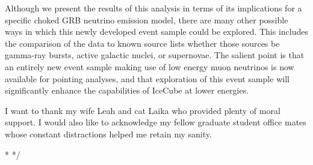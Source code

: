 \documentclass{gatech-thesis}
\begin{document}
\begin{preliminary}
\begin{preface}

Although we present the results of this analysis in terms of its implications for a specific choked GRB neutrino emission model, there are many other possible ways in which this newly developed event sample could be explored. This includes the comparison of the data to known source lists whether those sources be gamma-ray bursts, active galactic nuclei, or supernovae. The salient point is that an entirely new event sample making use of low energy muon neutrinos is now available for pointing analyses, and that exploration of this event sample will significantly enhance the capabilities of IceCube at lower energies.

\end{preface}

\begin{acknowledgements}
I want to thank my wife Leah and cat Laika who provided plenty of moral support. I would also like to acknowledge my fellow graduate student office mates whose constant distractions helped me retain my sanity.
\end{acknowledgements}
\contents

\begin{summary}

\long{}
\/*
*/


\end{summary}
\end{preliminary}
\end{document}
